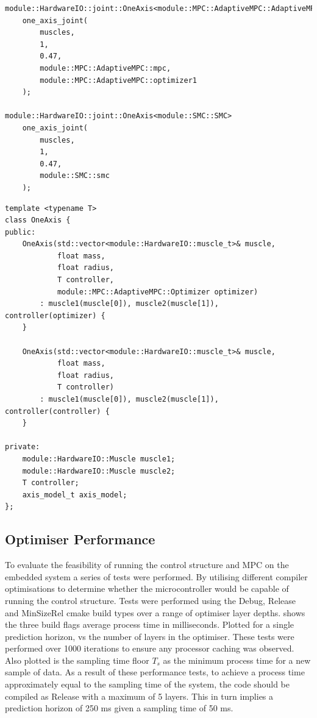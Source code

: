 \documentclass[11pt,a4paper]{article}
\begin{document}
\begin{listing}
\begin{verbatim}
module::HardwareIO::joint::OneAxis<module::MPC::AdaptiveMPC::AdaptiveMPC> 
    one_axis_joint(
        muscles, 
        1, 
        0.47, 
        module::MPC::AdaptiveMPC::mpc, 
        module::MPC::AdaptiveMPC::optimizer1
    );

module::HardwareIO::joint::OneAxis<module::SMC::SMC> 
    one_axis_joint(
        muscles, 
        1, 
        0.47,
        module::SMC::smc
    );
\end{verbatim}
\begin{verbatim}
template <typename T>
class OneAxis {
public:
    OneAxis(std::vector<module::HardwareIO::muscle_t>& muscle,
            float mass,
            float radius,
            T controller,
            module::MPC::AdaptiveMPC::Optimizer optimizer)
        : muscle1(muscle[0]), muscle2(muscle[1]), controller(optimizer) {
    }

    OneAxis(std::vector<module::HardwareIO::muscle_t>& muscle, 
            float mass, 
            float radius, 
            T controller)
        : muscle1(muscle[0]), muscle2(muscle[1]), controller(controller) {
    }
    
private:
    module::HardwareIO::Muscle muscle1;
    module::HardwareIO::Muscle muscle2;
    T controller;
    axis_model_t axis_model;
};
\end{verbatim}
\end{listing}

\subsection{Optimiser Performance}
\label{sub:optimiser_performance}
To evaluate the feasibility of running the control structure and MPC on the embedded system a series of tests were performed. By utilising different compiler optimisations to determine whether the microcontroller would be capable of running the control structure. Tests were performed using the Debug, Release and MinSizeRel cmake build types over a range of optimiser layer depths.  shows the three build flags average process time in milliseconds. Plotted for a single prediction horizon, vs the number of layers in the optimiser. These tests were performed over 1000 iterations to ensure any processor caching was observed. Also plotted is the sampling time floor $T_s$ as the minimum process time for a new sample of data. \newline
As a result of these performance tests, to achieve a process time approximately equal to the sampling time of the system, the code should be compiled as Release with a maximum of 5 layers. This in turn implies a prediction horizon of 250 ms given a sampling time of 50 ms.
\end{document}
